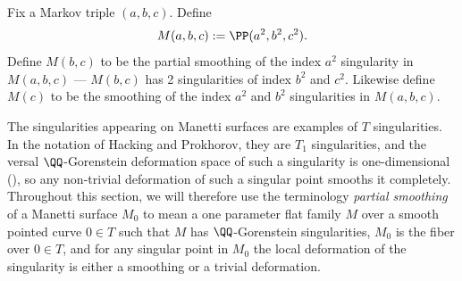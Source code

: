 \begin{definition}
Fix a Markov triple $(a,b,c)$. Define
\[
M(a,b,c):= \PP(a^2,b^2,c^2).
\]
Define $M(b,c)$ to be the partial smoothing of the index $a^2$ singularity in $M(a,b,c)$ --- \ie $M(b,c)$ has 2 singularities of index $b^2$ and $c^2$. Likewise define $M(c)$ to be the smoothing of the index $a^2$ and $b^2$ singularities in $M(a,b,c)$.
\end{definition}

\begin{remark}
The singularities appearing on Manetti surfaces are examples of $T$ singularities. In the notation of Hacking and Prokhorov, they are $T_1$ singularities, and the versal $\QQ$-Gorenstein deformation space of such a singularity is one-dimensional (\cf \cite[p.\,4]{HackProk}), so any non-trivial deformation of such a singular point smooths it completely. Throughout this section, we will therefore use the terminology \textit{partial smoothing} of a Manetti surface $M_0$ to mean a one parameter flat family $M$ over a smooth pointed curve $0\in T$ such that $M$ has $\QQ$-Gorenstein singularities, $M_0$ is the fiber over $0 \in T$, and for any singular point in $M_0$ the local deformation of the singularity is either a smoothing or a trivial deformation.
\end{remark}
